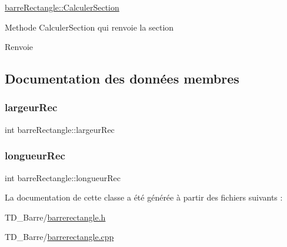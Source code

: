 \hyperlink{classbarre_rectangle_a321e3526a980b5d48a5cf9a05ee2b63a}{barre\+Rectangle\+::\+Calculer\+Section} 

Methode Calculer\+Section qui renvoie la section \begin{DoxyReturn}{Renvoie}

\end{DoxyReturn}


\subsection{Documentation des données membres}
\mbox{\label{classbarre_rectangle_a9420b90a6b3d44b807ca716abae6039e}} 
\subsubsection{\texorpdfstring{largeur\+Rec}{largeurRec}}
{\footnotesize\ttfamily int barre\+Rectangle\+::largeur\+Rec\hspace{0.3cm}{\ttfamily [private]}}

\mbox{\label{classbarre_rectangle_a5df869c01c9a2e2dad98fa392fa59c85}} 
\subsubsection{\texorpdfstring{longueur\+Rec}{longueurRec}}
{\footnotesize\ttfamily int barre\+Rectangle\+::longueur\+Rec\hspace{0.3cm}{\ttfamily [private]}}



La documentation de cette classe a été générée à partir des fichiers suivants \+:\begin{DoxyCompactItemize}
\item 
T\+D\+\_\+\+Barre/\hyperlink{barrerectangle_8h}{barrerectangle.\+h}\item 
T\+D\+\_\+\+Barre/\hyperlink{barrerectangle_8cpp}{barrerectangle.\+cpp}\end{DoxyCompactItemize}
